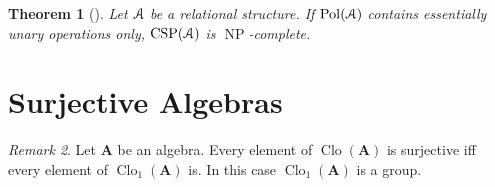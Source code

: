 \documentclass{amsart}
\theoremstyle{plain}
\newtheorem{theorem}{Theorem}[section]
\theoremstyle{definition}
\theoremstyle{remark}
\newtheorem{remark}[theorem]{Remark}
\DeclareMathOperator{\Clo}{Clo}
\DeclareMathOperator{\CSP}{CSP}
\DeclareMathOperator{\Pol}{Pol}
\DeclareMathOperator{\NP}{NP}
\begin{document}
\begin{theorem}[\cite{jeavons}]
    Let $\EuScript{A}$ be a relational structure. 
    If $\Pol(\EuScript{A})$ contains essentially unary operations only, $\CSP(\EuScript{A})$ is $\NP$-complete. 
\end{theorem}

\section{Surjective Algebras}
\begin{remark}
    \label{surj_group}
    Let $\mathbf{A}$ be an algebra. 
    Every element of $\Clo(\mathbf{A})$ is surjective iff every element of $\Clo_1(\mathbf{A})$ is. 
    In this case $\Clo_1(\mathbf{A})$ is a group. 
\end{remark}
\end{document}
